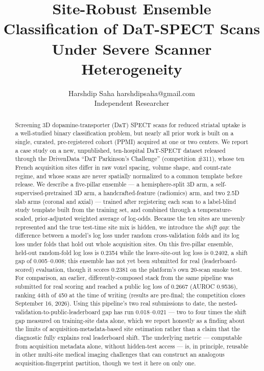 \documentclass[10pt]{article}
\title{Site-Robust Ensemble Classification of DaT-SPECT Scans Under Severe Scanner Heterogeneity}
\author{\name Harshdip Saha \email harshdipsaha@gmail.com \\
      \addr Independent Researcher}
\begin{document}
\maketitle

\begin{abstract}
Screening 3D dopamine-transporter (DaT) SPECT scans for reduced striatal uptake is a well-studied binary classification problem, but nearly all prior work is built on a single, curated, pre-registered cohort (PPMI) acquired at one or two centers. We report a case study on a new, unpublished, ten-hospital DaT-SPECT dataset released through the DrivenData ``DaT Parkinson's Challenge'' (competition \#311), whose ten French acquisition sites differ in raw voxel spacing, volume shape, and count-rate regime, and whose scans are never spatially normalized to a common template before release. We describe a five-pillar ensemble --- a hemisphere-split 3D arm, a self-supervised-pretrained 3D arm, a handcrafted-feature (radiomics) arm, and two 2.5D slab arms (coronal and axial) --- trained after registering each scan to a label-blind study template built from the training set, and combined through a temperature-scaled, prior-adjusted weighted average of log-odds. Because the ten sites are unevenly represented and the true test-time site mix is hidden, we introduce the \emph{shift gap}: the difference between a model's log loss under random cross-validation folds and its log loss under folds that hold out whole acquisition sites. On this five-pillar ensemble, held-out random-fold log loss is 0.2354 while the leave-site-out log loss is 0.2402, a shift gap of 0.005--0.008; this ensemble has not yet been submitted for real (leaderboard-scored) evaluation, though it scores 0.2381 on the platform's own 20-scan smoke test. For comparison, an earlier, differently-composed stack from the same pipeline was submitted for real scoring and reached a public log loss of 0.2667 (AUROC 0.9536), ranking 44th of 450 at the time of writing (results are pre-final; the competition closes September 16, 2026). Using this pipeline's two real submissions to date, the nested-validation-to-public-leaderboard gap has run 0.018--0.021 --- two to four times the shift gap measured on training-site data alone, which we report honestly as a finding about the limits of acquisition-metadata-based site estimation rather than a claim that the diagnostic fully explains real leaderboard shift. The underlying metric --- computable from acquisition metadata alone, without hidden-test access --- is, in principle, reusable in other multi-site medical imaging challenges that can construct an analogous acquisition-fingerprint partition, though we test it here on only one.
\end{abstract}
\end{document}

